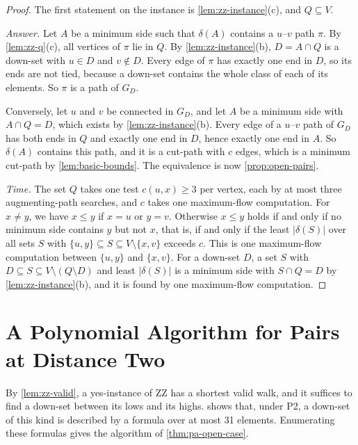 \begin{proof}
The first statement on the instance is \cref{lem:zz-instance}(c), and $Q \subseteq V$.

\emph{Answer.}
Let $A$ be a minimum side such that $\delta(A)$ contains a $u$--$v$ path $\pi$.
By \cref{lem:zz-q}(c), all vertices of $\pi$ lie in $Q$.
By \cref{lem:zz-instance}(b), $D = A \cap Q$ is a down-set with $u \in D$ and $v \notin D$.
Every edge of $\pi$ has exactly one end in $D$, so its ends are not tied, because a down-set contains the whole class of each of its elements.
So $\pi$ is a path of $G_D$.

Conversely, let $u$ and $v$ be connected in $G_D$, and let $A$ be a minimum side with $A \cap Q = D$, which exists by \cref{lem:zz-instance}(b).
Every edge of a $u$--$v$ path of $G_D$ has both ends in $Q$ and exactly one end in $D$, hence exactly one end in $A$.
So $\delta(A)$ contains this path, and it is a cut-path with $c$ edges, which is a minimum cut-path by \cref{lem:basic-bounds}.
The equivalence is now \cref{prop:open-pairs}.

\emph{Time.}
The set $Q$ takes one test $c(u, x) \geq 3$ per vertex, each by at most three augmenting-path searches, and $c$ takes one maximum-flow computation.
For $x \neq y$, we have $x \leq y$ if $x = u$ or $y = v$.
Otherwise $x \leq y$ holds if and only if no minimum side contains $y$ but not $x$, that is, if and only if the least $|\delta(S)|$ over all sets $S$ with $\{u, y\} \subseteq S \subseteq V \setminus \{x, v\}$ exceeds $c$.
This is one maximum-flow computation between $\{u, y\}$ and $\{x, v\}$.
For a down-set $D$, a set $S$ with $D \subseteq S \subseteq V \setminus (Q \setminus D)$ and least $|\delta(S)|$ is a minimum side with $S \cap Q = D$ by \cref{lem:zz-instance}(b), and it is found by one maximum-flow computation.
\end{proof}

\section{A Polynomial Algorithm for Pairs at Distance Two}
\label{sec:pa-polynomial}

By \cref{lem:zz-valid}, a yes-instance of ZZ has a shortest valid walk, and it suffices to find a down-set between its lows and its highs.
 shows that, under P2, a down-set of this kind is described by a formula over at most 31 elements.
Enumerating these formulas gives the algorithm of \cref{thm:pa-open-case}.

